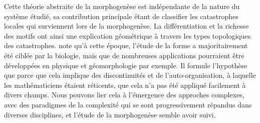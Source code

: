 {Cette théorie abstraite de la morphogenèse est indépendante de la nature du système étudié, sa contribution principale étant de classifier les catastrophes locales qui surviennent lors de la morphogenèse. La différentiation et la richesse des motifs ont ainsi une explication géométrique à travers les types topologiques des catastrophes.  note qu'à cette époque, l'étude de la forme a majoritairement été ciblée par la biologie, mais que de nombreuses applications pourraient être développées en physique et géomorphologie par exemple. Il formule l'hypothèse que parce que cela implique des discontinuités et de l'auto-organisation, à laquelle les mathématiciens étaient réticents, que cela n'a pas été appliqué facilement à divers champs. Nous pouvons lier cela à l'émergence des approches complexes, avec des paradigmes de la complexité qui se sont progressivement répandus dans diverses disciplines, et l'étude de la morphogenèse semble avoir suivi. 
}








